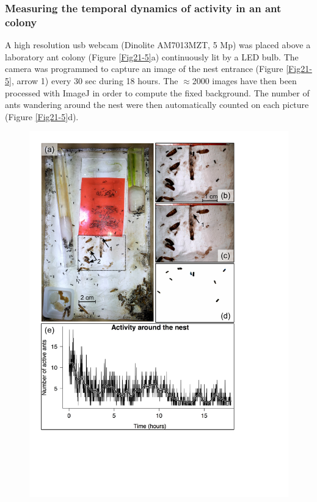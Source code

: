 \subsubsection{Measuring the temporal dynamics of activity in an ant colony}

A high resolution usb webcam (Dinolite AM7013MZT, 5 Mp) was placed above a
laboratory ant colony (Figure \ref{Fig21-5}a) continuously lit by a LED bulb. The camera was
programmed to capture an image of the nest entrance (Figure \ref{Fig21-5}, arrow 1) every 30
sec during 18 hours. The $\approx$2000 images have then been processed with ImageJ in
order to compute the fixed background. The number of ants wandering around the
nest were then automatically counted on each picture (Figure \ref{Fig21-5}d).

\begin{figure}[!h] %
\centering
\includegraphics[height=0.60\textheight]{2_Methodo/Fig/5_Fourmis.pdf} 

\end{figure}
